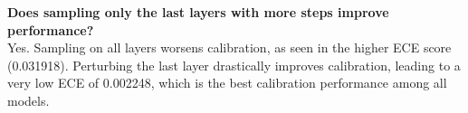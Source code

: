 \begin{enumerate}
\begin{enumerate}
    \textbf{Does sampling only the last layers with more steps improve performance?} \\

    Yes. Sampling on all layers worsens calibration, as seen in the higher ECE
    score (0.031918). Perturbing the last layer drastically improves
    calibration, leading to a very low ECE of 0.002248, which is the best
    calibration performance among all models.

\end{enumerate}

\end{enumerate}

%

